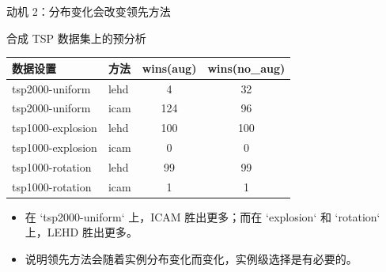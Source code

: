 \documentclass{ctexbeamer}
\begin{document}
\begin{frame}{动机 2：分布变化会改变领先方法}
  \scriptsize
  \begin{block}{合成 TSP 数据集上的预分析}
    \centering
    \begin{tabular}{llcc}
      \hline
      数据设置 & 方法 & wins(aug) & wins(no\_aug) \\
      \hline
      tsp2000-uniform & lehd & 4   & 32 \\
      tsp2000-uniform & icam & 124 & 96 \\
      \hline
      tsp1000-explosion & lehd & 100 & 100 \\
      tsp1000-explosion & icam & 0   & 0 \\
      \hline
      tsp1000-rotation & lehd & 99 & 99 \\
      tsp1000-rotation & icam & 1  & 1 \\
      \hline
    \end{tabular}
  \end{block}

  \vspace{0.5em}
  \begin{itemize}
    \item 在 `tsp2000-uniform` 上，ICAM 胜出更多；而在 `explosion` 和 `rotation` 上，LEHD 胜出更多。
    \item 说明领先方法会随着实例分布变化而变化，实例级选择是有必要的。
  \end{itemize}
\end{frame}
\end{document}
